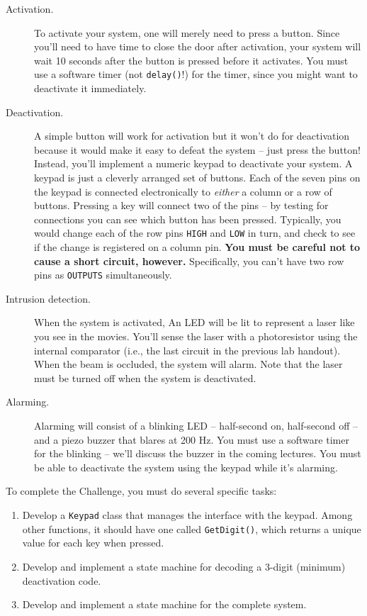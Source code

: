 \documentclass[11pt]{article} %
\begin{document}
\begin{description}
\item[ Activation.] To activate your system, one will merely need to press a button. Since you’ll need to have time to close the door after activation, your system will wait 10 seconds after the button is pressed before it activates. You must use a software timer (not \verb|delay()|!) for the timer, since you might want to deactivate it immediately.
\item[ Deactivation.] A simple button will work for activation but it won’t do for deactivation because it would make it easy to defeat the system -- just press the button! Instead, you’ll implement a numeric keypad to deactivate your system. A keypad is just a cleverly arranged set of buttons. Each of the seven pins on the keypad is connected electronically to \emph{either} a column or a row of buttons. Pressing a key will connect two of the pins -- by testing for connections you can see which button has been pressed. Typically, you would change each of the row pins \verb|HIGH| and \verb|LOW| in turn, and check to see if the change is registered on a column pin. {\bf You must be careful not to cause a short circuit, however.} Specifically, you can’t have two row pins as \verb|OUTPUTS| simultaneously.
\item[ Intrusion detection.] When the system is activated, An LED will be lit to represent a laser like you see in the movies. You’ll sense the laser with a photoresistor using the internal comparator (i.e., the last circuit in the previous lab handout). When the beam is occluded, the system will alarm. Note that the laser must be turned off when the system is deactivated.
\item[ Alarming.] Alarming will consist of a blinking LED -- half-second on, half-second off -- and a piezo buzzer that blares at 200 Hz. You must use a software timer for the blinking -- we’ll discuss the buzzer in the coming lectures. You must be able to deactivate the system using the keypad while it’s alarming.
\end{description}

To complete the Challenge, you must do several specific tasks:

\begin{enumerate}
\item Develop a \verb|Keypad| class that manages the interface with the keypad. Among other functions, it should have one called \verb|GetDigit()|, which returns a unique value for each key when pressed.
\item Develop and implement a state machine for decoding a 3-digit (minimum) deactivation code.
\item Develop and implement a state machine for the complete system.
\end{enumerate}
\end{document}
